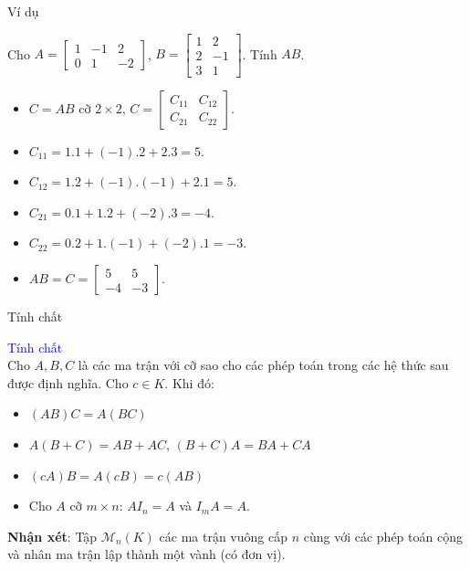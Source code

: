 \documentclass[pdf,10pt]{beamer}
\begin{document}
\begin{frame}{Ví dụ}
	
	Cho $A = \left[ 
	\begin{array}{rrr}
		1 & -1 & 2  \\
		0 & 1 & -2 
	\end{array}
	\right]$, 
	$B = \left[
	\begin{array}{rr}
		1 & 2 \\
		2 & -1 \\
		3 & 1 
	\end{array}
	\right]$.
	Tính $AB$.
	\begin{itemize}
		\item $C = AB$ cỡ $2 \times 2$, $C = \left[ \begin{array}{rr}
			C_{11}  & C_{12} \\
			C_{21} & C_{22} 
		\end{array}
		\right] $.
		\item $C_{11}=1.1+(-1).2+2.3=5 .$
		\item $C_{12}=1.2+(-1).(-1)+2.1=5 .$
		\item $C_{21}=0.1+1.2+(-2).3=-4 .$
		\item $C_{22}=0.2+1.(-1)+(-2).1=-3 .$
		\item $AB=C= \left[ 
		\begin{array}{rr}
			5     &  5 \\
			-4     & -3 
		\end{array}
		\right] $.
	\end{itemize}
\end{frame}

\begin{frame}{Tính chất}
\begin{tcolorbox}
\textcolor{blue}{Tính chất} \\[2mm]
Cho $A,B,C$ là các ma trận với cỡ sao cho các phép toán trong các hệ thức sau được định nghĩa. Cho $c \in K$. Khi đó:
\begin{itemize}
	\item $(AB)C=A(BC)$
	\item $A(B+C)=AB+AC$, $(B+C)A=BA+CA$
	\item $(cA)B=A(cB)=c(AB)$
	\item Cho $A$ cỡ $m \times n$: $AI_{n} = A$ và $I_{m} A = A$.
\end{itemize}
\end{tcolorbox}
\textbf{Nhận xét}: Tập $\mathcal{M}_{n}(K)$ các ma trận vuông cấp $n$ cùng với các phép toán cộng và nhân ma trận lập thành một vành (có đơn vị).
\end{frame}
\end{document}
